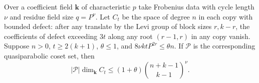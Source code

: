 \begin{lemma}
\label{lem:a-edge-defect-count}
\emitthmsource
Over a coefficient field $\mathbf k$ of characteristic $p$ take Frobenius data with cycle length $\nu$ and residue field size $q=P^\nu$. Let $C_t$ be the space of degree $n$ in each copy with bounded defect: after any translate by the Levi group of block sizes $r,k-r$, the coefficients of defect exceeding $3t$ along any root $(r-1,r)$ in any copy vanish. Suppose $n>0$, $t\ge2(k+1)$, $\theta\le1$, and $8\nu kt P^{2r}\le\theta n$. If $\mathcal P$ is the corresponding quasiparabolic coset set, then
\[
 |\mathcal P|\dim_{\mathbf k} C_t
 \le (1+\theta)\binom{n+k-1}{k-1}^{\nu}.
\]
\end{lemma}

